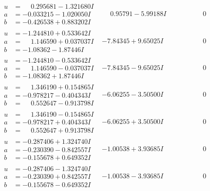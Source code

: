 \documentclass[1p]{elsarticle_modified}
\theoremstyle{definition}
\begin{document}
$$\begin{array}{c|c|c}
\begin{aligned}
u &= \phantom{-}0.295681 - 1.321680 I \\
a &= -0.033215 - 1.020050 I \\
b &= -0.426538 + 0.883202 I\end{aligned}
 & \phantom{-}0.95791 - 5.99188 I & \phantom{-0.000000 } 0 \\ \hline\begin{aligned}
u &= -1.244810 + 0.533642 I \\
a &= \phantom{-}1.146590 + 0.037037 I \\
b &= -1.08362 - 1.87446 I\end{aligned}
 & -7.84345 + 9.65025 I & \phantom{-0.000000 } 0 \\ \hline\begin{aligned}
u &= -1.244810 - 0.533642 I \\
a &= \phantom{-}1.146590 - 0.037037 I \\
b &= -1.08362 + 1.87446 I\end{aligned}
 & -7.84345 - 9.65025 I & \phantom{-0.000000 } 0 \\ \hline\begin{aligned}
u &= \phantom{-}1.346190 + 0.154865 I \\
a &= -0.978217 - 0.404343 I \\
b &= \phantom{-}0.552647 - 0.913798 I\end{aligned}
 & -6.06255 - 3.50500 I & \phantom{-0.000000 } 0 \\ \hline\begin{aligned}
u &= \phantom{-}1.346190 - 0.154865 I \\
a &= -0.978217 + 0.404343 I \\
b &= \phantom{-}0.552647 + 0.913798 I\end{aligned}
 & -6.06255 + 3.50500 I & \phantom{-0.000000 } 0 \\ \hline\begin{aligned}
u &= -0.287406 + 1.324740 I \\
a &= -0.230390 - 0.842557 I \\
b &= -0.155678 + 0.649352 I\end{aligned}
 & -1.00538 + 3.93685 I & \phantom{-0.000000 } 0 \\ \hline\begin{aligned}
u &= -0.287406 - 1.324740 I \\
a &= -0.230390 + 0.842557 I \\
b &= -0.155678 - 0.649352 I\end{aligned}
 & -1.00538 - 3.93685 I & \phantom{-0.000000 } 0 \\ \hline\begin{aligned}

\end{aligned}
\end{array}$$
\end{document}
